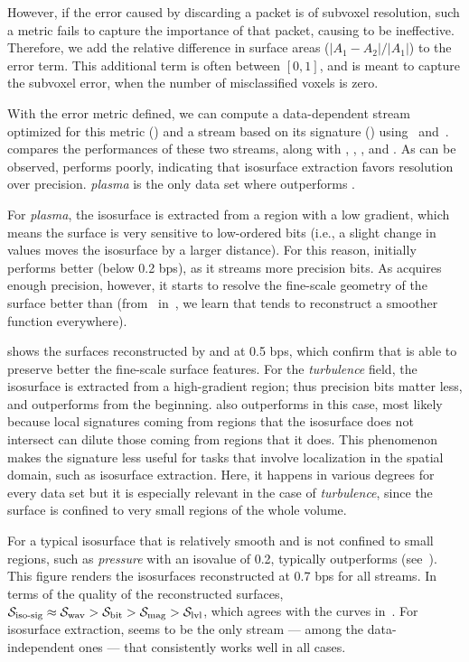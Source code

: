 However, if the error caused by discarding a packet is of subvoxel resolution, such a metric fails
to capture the importance of that packet, causing \siop to be ineffective. Therefore, we add the
relative difference in surface areas ($|A_1-A_2|/|A_1|$) to the error term. This additional term is
often between $[0, 1]$, and is meant to capture the subvoxel error, when the number of misclassified
voxels is zero.

With the error metric defined, we can compute a data-dependent stream optimized for this metric
(\siop) and a stream based on its signature (\sisg) using~
and~.  compares the performances of these two
streams, along with \sbit, \slvl, \swav, and \smag. As can be observed, \slvl performs poorly,
indicating that isosurface extraction favors resolution over precision. \emph{plasma} is the only
data set where \sbit outperforms \swav.

For \emph{plasma}, the isosurface is extracted from a region with a low gradient, which means the
surface is very sensitive to low-ordered bits (i.e., a slight change in values moves the isosurface
by a larger distance). For this reason, \swav initially performs better (below 0.2 bps), as it
streams more precision bits. As \sbit acquires enough precision, however, it starts to resolve the
fine-scale geometry of the surface better than \swav
(from~ in~, we learn that \swav
tends to reconstruct a smoother function everywhere).

 shows the surfaces reconstructed by \sbit
and \swav at 0.5 bps, which confirm that \sbit is able to preserve better the fine-scale surface
features. For the \emph{turbulence} field, the isosurface is extracted from a high-gradient region;
thus precision bits matter less, and \sbit outperforms \swav from the beginning. \sbit also
outperforms \sisg in this case, most likely because local signatures coming from regions that the
isosurface does not intersect can dilute those coming from regions that it does. This phenomenon
makes the signature less useful for tasks that involve localization in the spatial domain, such as
isosurface extraction. Here, it happens in various degrees for every data set but it is especially
relevant in the case of \emph{turbulence}, since the surface is confined to very small regions of
the whole volume.

For a typical isosurface that is relatively smooth and is not confined to small regions, such as
\emph{pressure} with an isovalue of 0.2, \swav typically outperforms \sbit
(see~). This figure renders the isosurfaces reconstructed at
0.7 bps for all streams. In terms of the quality of the reconstructed surfaces, $\sisg \approx \swav
> \sbit > \smag > \slvl$, which agrees with the curves in~. For
isosurface extraction, \swav seems to be the only stream --- among the data-independent ones ---
that consistently works well in all cases.

